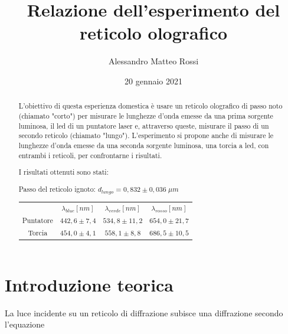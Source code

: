 \documentclass{article}
\title{Relazione dell'esperimento del reticolo olografico}
\author{Alessandro Matteo Rossi}
\date{20 gennaio 2021}
\begin{document}
\maketitle

\begingroup
{}
\begin{abstract}
    \centering
    L'obiettivo di questa esperienza domestica è usare un reticolo olografico di passo noto (chiamato "corto") per misurare le lunghezze d'onda emesse da una prima sorgente luminosa, il led di un puntatore laser e, attraverso queste, misurare il passo di un secondo reticolo (chiamato "lungo").
    L'esperimento si propone anche di misurare le lunghezze d'onda emesse da una seconda sorgente luminosa, una torcia a led, con entrambi i reticoli, per confrontarne i risultati.
    
    I risultati ottenuti sono stati:
    
    Passo del reticolo ignoto: \indent $d_{lungo} = 0,832 \pm 0,036 \; \mu m$

    \begin{table}[h]
        \centering
        \begin{tabular}[h]{||c|c|c|c||}
            \hline
            & \cellcolor{blue}$\lambda_{blue} [nm]$ & \cellcolor{green} $\lambda_{verde}[nm]$ & \cellcolor{red} $\lambda_{rosso}[nm]$\\
            Puntatore & $442,6 \pm 7,4$ & $534,8 \pm 11,2$ & $654,0 \pm 21,7$\\
            \hline
            Torcia & $454,0 \pm 4,1$ & $ 558,1 \pm 8,8 $ & $ 686,5 \pm 10,5 $ \\
            \hline
        \end{tabular}
    \end{table}

\end{abstract}
\endgroup



\tableofcontents
\newpage

\section{Introduzione teorica}

La luce incidente su un reticolo di diffrazione subisce una diffrazione secondo l'equazione
\end{document}
